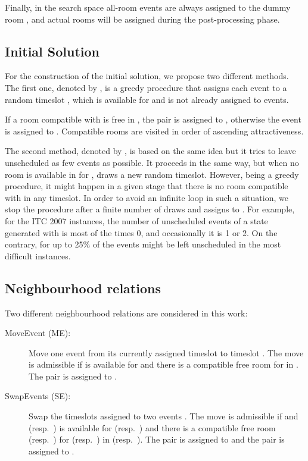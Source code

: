 \documentclass[authoryear,preprint,a4paper,12pt]{elsarticle}
\begin{document}
Finally, in the search space all-room events are always assigned to
the dummy room , and actual rooms will be assigned during
the post-processing phase.

\subsection{Initial Solution}

For the construction of the initial solution, we propose two different
methods.  The first one, denoted by , is a greedy procedure
that assigns each event  to a random timeslot , which is available
for  and is not already assigned to  events.

If a room  compatible with  is free in , the pair  is
assigned to , otherwise the event is assigned to
. Compatible rooms are visited in order of
ascending attractiveness. 

The second method, denoted by , is based on the same idea but
it tries to leave unscheduled as few events as possible.  It proceeds
in the same way, but when no room is available in  for
,  draws a new random timeslot. However, being a greedy
procedure, it might happen in a given stage that there
is no room compatible with  in any timeslot. In order to avoid an infinite loop in such a situation, we stop the procedure after a finite number of draws and
assigns  to . 
For example, for the ITC 2007 instances, the number of unscheduled
events of a state generated with  is most of the times 0, and
occasionally it is 1 or 2. On the contrary, for  up
to 25\% of the events might be left unscheduled in the most difficult
instances.

\subsection{Neighbourhood relations}

Two different neighbourhood relations are considered in this work:

\begin{description}
\item[\textsf{MoveEvent (ME)}:] Move one event  from its
  currently assigned timeslot to timeslot .
  The move  is admissible if  is available for
   and there is a compatible free room  for  in .
The pair  is assigned to .

\item[\textsf{SwapEvents (SE)}:] Swap the timeslots  assigned to two events .  The move  is admissible if  and  (resp.\ ) is available for  (resp.\
  ) and there is a compatible free room  (resp.\ ) for
   (resp.\ ) in  (resp.\ ). The pair 
  is assigned to  and the pair  is assigned to .
\end{description}
\end{document}

